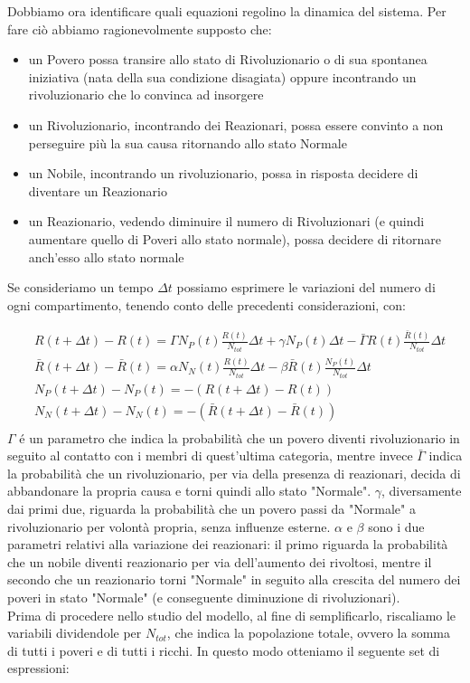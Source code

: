 Dobbiamo ora identificare quali equazioni regolino la dinamica del sistema. Per fare ciò abbiamo ragionevolmente supposto che:
\begin{itemize}
	\item un Povero possa transire allo stato di Rivoluzionario o di sua spontanea iniziativa (nata della sua condizione disagiata) oppure incontrando un rivoluzionario che lo convinca ad insorgere
	\item un Rivoluzionario, incontrando dei Reazionari, possa essere convinto a non perseguire più la sua causa ritornando allo stato Normale
	\item un Nobile, incontrando un rivoluzionario, possa in risposta decidere di diventare un Reazionario
	\item un Reazionario, vedendo diminuire il numero di Rivoluzionari (e quindi aumentare quello di Poveri allo stato normale), possa decidere di ritornare anch'esso allo stato normale  
\end{itemize}
Se consideriamo un tempo $\Delta t$ possiamo esprimere le variazioni del numero di ogni compartimento, tenendo conto delle precedenti considerazioni, con:

\begin{equation}
	\begin{aligned}
		 &R(t+\Delta t)-R(t)=\Gamma N_P(t) \frac{R(t)}{N_{tot}}\Delta t+\gamma N_P(t)\Delta t-\bar{\Gamma}R(t)\frac{\bar{R}(t)}{N_{tot}}\Delta t\\
		&\bar{R}(t+\Delta t)-\bar{R}(t)=\alpha N_N(t)\frac{R(t)}{N_{tot}}\Delta t-\beta \bar{R}(t)\frac{N_P(t)}{N_{tot}}\Delta t\\
		&N_P(t+\Delta t)-N_P(t)=-(R(t+\Delta t)-R(t))\\
		&N_N(t+\Delta t)-N_N(t)=-(\bar{R}(t+\Delta t)-\bar{R}(t))\\
	\end{aligned}     
\end{equation}	
$ \Gamma $ é un parametro che indica la probabilità che un povero diventi rivoluzionario in seguito al contatto con i membri di quest'ultima categoria, mentre invece $ \bar{\Gamma} $ indica la probabilità che un rivoluzionario, per via della presenza di reazionari, decida di abbandonare la propria causa e torni quindi allo stato "Normale". $\gamma$, diversamente dai primi due, riguarda la probabilità che un povero passi da "Normale" a rivoluzionario per volontà propria, senza influenze esterne. $ \alpha $ e $ \beta $ sono i due parametri relativi alla variazione dei reazionari: il primo riguarda la probabilità che un nobile diventi reazionario per via dell'aumento dei rivoltosi, mentre il secondo che un reazionario torni "Normale" in seguito alla crescita del numero dei poveri in stato "Normale" (e conseguente diminuzione di rivoluzionari). \\
Prima di procedere nello studio del modello, al fine di semplificarlo, riscaliamo le variabili dividendole per $ N_{tot}$, che indica la popolazione totale, ovvero la somma di tutti i poveri e di tutti i ricchi. In questo modo otteniamo il seguente set di espressioni:  

